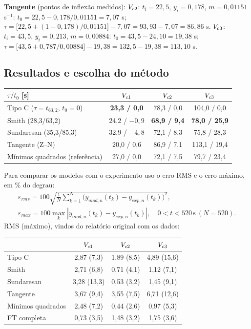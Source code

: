 \textbf{Tangente} (pontos de inflexão medidos): $V_{c2}$: $t_i=22{,}5$, $y_i=0{,}178$, $m=0{,}01151$ s$^{-1}$: $t_0=22{,}5-0{,}178/0{,}01151=7{,}07$ s; $\tau=\big[22{,}5+(1-0{,}178)/0{,}01151\big]-7{,}07=93{,}93-7{,}07=86{,}86$ s. $V_{c3}$: $t_i=43{,}5$, $y_i=0{,}213$, $m=0{,}00884$: $t_0=43{,}5-24{,}10=19{,}38$ s; $\tau=\big[43{,}5+0{,}787/0{,}00884\big]-19{,}38=132{,}5-19{,}38=113{,}10$ s.

\subsection{Resultados e escolha do método}
\begin{center}\small
\begin{tabular}{lccc}\toprule $\tau/t_0$ [s] & $V_{c1}$ & $V_{c2}$ & $V_{c3}$\\\midrule
Tipo C ($\tau=t_{63,2}$, $t_0=0$) & \textbf{23,3 / 0,0} & 78,3 / 0,0 & 104,0 / 0,0\\
Smith (28,3/63,2) & 24,2 / $-0{,}9$ & \textbf{68,9 / 9,4} & \textbf{78,0 / 25,9}\\
Sundaresan (35,3/85,3) & 32,9 / $-4{,}8$ & 72,1 / 8,3 & 75,8 / 28,3\\
Tangente (Z--N) & 20,0 / 0,6 & 86,9 / 7,1 & 113,1 / 19,4\\
Mínimos quadrados (referência) & 27,0 / 0,0 & 72,1 / 7,5 & 79,7 / 23,4\\\bottomrule
\end{tabular}\end{center}
Para comparar os modelos com o experimento uso o erro RMS e o erro máximo, em \% do degrau:
\[
\begin{gathered}\varepsilon_{rms}=100\sqrt{\frac1N\sum_{k=1}^{N}\big(y_{mod,n}(t_k)-y_{exp,n}(t_k)\big)^2},\\
\varepsilon_{max}=100\max_k|y_{mod,n}(t_k)-y_{exp,n}(t_k)|,\quad 0<t<520\,\mathrm{s}\ (N=520).\end{gathered}
\]
RMS (máximo), vindos do relatório original com os dados:
\begin{center}\small
\begin{tabular}{lccc}\toprule & $V_{c1}$ & $V_{c2}$ & $V_{c3}$\\\midrule
Tipo C & 2,87 (7,3) & 1,89 (8,5) & 4,89 (15,6)\\
Smith & 2,71 (6,8) & 0,71 (4,1) & 1,12 (7,1)\\
Sundaresan & 3,28 (13,3) & 0,53 (3,2) & 1,45 (9,1)\\
Tangente & 3,67 (9,4) & 3,55 (7,5) & 6,71 (12,6)\\
Mínimos quadrados & 2,48 (7,2) & 0,44 (2,6) & 0,97 (5,3)\\
FT completa & 0,73 (3,5) & 1,48 (3,2) & 1,75 (3,6)\\\bottomrule
\end{tabular}\end{center}
